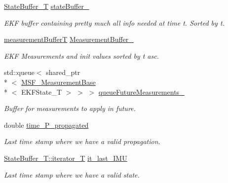 \begin{DoxyCompactItemize}
\item 
\hyperlink{classmsf__core_1_1MSF__Core_a71db0f8ef9e865ef4d85b7365f01388d}{State\-Buffer\-\_\-\-T} \hyperlink{classmsf__core_1_1MSF__Core_a1432cacae3165725ebef0094fc5e5389}{state\-Buffer\-\_\-}
\begin{DoxyCompactList}\small\item\em E\-K\-F buffer containing pretty much all info needed at time t. Sorted by t. \end{DoxyCompactList}\item 
\hyperlink{classmsf__core_1_1MSF__Core_abbdace8623ce8be7c430f6f7dad6b6fa}{measurement\-Buffer\-T} \hyperlink{classmsf__core_1_1MSF__Core_a3e1a3bbacae4dbb01bb0d3f9d415870e}{Measurement\-Buffer\-\_\-}
\begin{DoxyCompactList}\small\item\em E\-K\-F Measurements and init values sorted by t asc. \end{DoxyCompactList}\item 
std\-::queue$<$ shared\-\_\-ptr\\*
$<$ \hyperlink{classmsf__core_1_1MSF__MeasurementBase}{M\-S\-F\-\_\-\-Measurement\-Base}\\*
$<$ E\-K\-F\-State\-\_\-\-T $>$ $>$ $>$ \hyperlink{classmsf__core_1_1MSF__Core_a71ec97d583c23110fb4224888183094d}{queue\-Future\-Measurements\-\_\-}
\begin{DoxyCompactList}\small\item\em Buffer for measurements to apply in future. \end{DoxyCompactList}\item 
double \hyperlink{classmsf__core_1_1MSF__Core_a24258a549bce8e83b9f551261a603139}{time\-\_\-\-P\-\_\-propagated}
\begin{DoxyCompactList}\small\item\em Last time stamp where we have a valid propagation. \end{DoxyCompactList}\item 
\hyperlink{classmsf__core_1_1SortedContainer_ac060dafe3a40d73ef6d35f4be7e0213e}{State\-Buffer\-\_\-\-T\-::iterator\-\_\-\-T} \hyperlink{classmsf__core_1_1MSF__Core_a55c7abe519e665bd97feabf4b0584067}{it\-\_\-last\-\_\-\-I\-M\-U}
\begin{DoxyCompactList}\small\item\em Last time stamp where we have a valid state. \end{DoxyCompactList}\item 

\end{DoxyCompactItemize}
